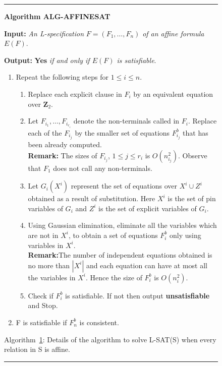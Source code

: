\smallspacing

{\small
\begin{figure}[tbp]
\rule{\textwidth}{0.01in}

\noindent
{\bf Algorithm ALG-AFFINESAT} 

\noindent
{\bf Input:} {\it An L-specification} $F = (F_1, \ldots , F_n)$
{\it of an affine formula } $E(F)$.  

\noindent
{\bf Output:} {\bf Yes} {\it if and only if $E(F)$ is satisfiable}. 

\begin{enumerate}

\item
Repeat the following steps for $1 \leq i \leq n$.

\begin{enumerate}

\item
Replace each explicit clause in $F_i$ by an equivalent equation over 
{\bf Z}$_2$.

\item
Let $F_{i_1}, \ldots, F_{i_{r_i}}$ denote the non-terminals called in $F_i$.
Replace each of the $F_{i_j}$ by the smaller set of equations $F^b_{i_j}$
that has been already computed.\\
{\bf Remark:} The sizes of $F_{i_j}$, $ 1 \leq j \leq r_i$ is $O(n_{i_j}^2)$.
Observe that $F_1$ does not call any non-terminals.

\item 
Let $G_i(X^i)$ represent the set of equations  over $X^i \cup Z^i$
obtained as a result of substitution. Here $X^i$ is the set of pin variables of $G_i$ 
and $Z^i$ is the set of explicit variables of $G_i$.


\item
Using Gaussian elimination, eliminate all the variables which are not
in $X^i$, to obtain a set of equations $F^b_i$ only using variables in $X^i$.\\
{\bf Remark:}The number of independent equations obtained 
is no more than $|X^i|$ and
each equation can have at most all the variables in $X^i$.
Hence the size of $F^b_i$ is $O(n_i^2)$.

\item
Check if $F^b_i$ is satisfiable. If not then output {\bf unsatisfiable} and 
Stop.

\end{enumerate}


\item
F is satisfiable if $F_n^b$ is consistent.

\end{enumerate}
\label{laffinesat:alg}
\begin{center}
Algorithm~\ref{laffinesat:alg}: Details of the algorithm to solve {\sf L-SAT(S)
when every relation in {\sf S} is affine.}
\end{center}
\vspace*{-.2in}
\rule{\textwidth}{0.01in}
\end{figure}
}

